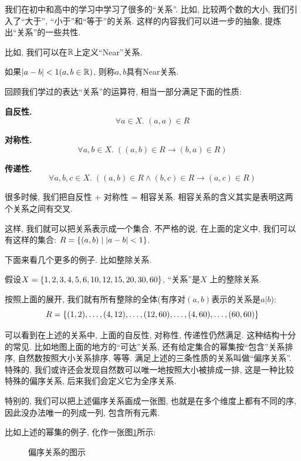 我们在初中和高中的学习中学习了很多的``关系''. 比如, 比较两个数的大小, 我们引入了``大于'', ``小于''和``等于''的关系. 这样的内容我们可以进一步的抽象, 提炼出``关系''的一些共性. 

比如, 我们可以在$\mathbb{R}$上定义``Near''关系.

\begin{eg}
    如果$|a - b| < 1(a, b \in \mathbb{R})$, 则称$a, b$具有Near关系. 
\end{eg}

回顾我们学过的表达``关系''的运算符, 相当一部分满足下面的性质: 

\textbf{自反性. }
$$\forall a \in X.\; (a, a) \in R$$

\textbf{对称性. }
$$\forall a, b \in X.\; ((a, b) \in R \to (b, a) \in R)$$

\textbf{传递性. }
$$\forall a, b, c \in X.\; ((a, b) \in R \land (b, c) \in R \to (a, c) \in R)$$

很多时候, 我们把自反性 + 对称性 = 相容关系. 相容关系的含义其实是表明这两个关系之间有交叉.

这样, 我们就可以把关系表示成一个集合. 不严格的说, 在上面的定义中, 我们可以有这样的集合: $R = \{(a, b) \mid |a - b| < 1\}$. 

下面来看几个更多的例子. 比如整除关系. 

\begin{eg}
    假设$X = \{1, 2, 3, 4, 5, 6, 10, 12, 15, 20, 30, 60\}$, ``关系''是$X$ 上的整除关系. 
\end{eg}

按照上面的展开, 我们就有所有整除的全体(有序对$(a,b)$表示的关系是$a|b$):
$$R = \{(1, 2), \dots, (4, 12), \dots, (12, 60), \dots, (4, 60), \dots, (60, 60)\}$$

可以看到在上述的关系中, 上面的自反性, 对称性, 传递性仍然满足. 这种结构十分的常见. 比如地图上面的地方的``可达''关系, 还有给定集合的幂集按``包含''关系排序, 自然数按照大小关系排序, 等等. 满足上述的三条性质的关系叫做``偏序关系''. 特殊的, 我们或许还会发现自然数可以唯一地按照大小被排成一排, 这是一种比较特殊的偏序关系, 后来我们会定义它为全序关系. 

特别的, 我们可以把上述偏序关系画成一张图, 也就是在多个维度上都有不同的序, 因此没办法唯一的列成一列, 包含所有元素. 

比如上述的幂集的例子, 化作一张图\ref{fig:part-order-fig}所示: 
\begin{figure}[!htbp]
	\begin{center}
	\end{center}
	\caption{偏序关系的图示}
	\label{fig:part-order-fig}
\end{figure}

